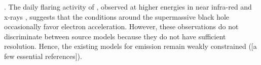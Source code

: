 \citep[see][and references therein]{2018ApJ...865..104J}.
The daily flaring activity of \sgra, observed at higher energies in near infra-red and x-rays \citep[e.g.,][]{2009ApJ...698..676D, 2019ApJ...886...96H}, suggests that the conditions around the supermassive black hole occasionally favor electron acceleration.
However, these observations do not discriminate between source models because they do not have sufficient resolution. Hence, the existing models for \sgra emission remain weakly constrained ([a few essential references]).


